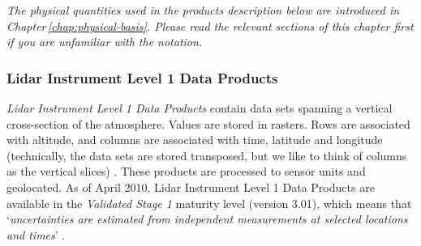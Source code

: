 \noindent\textit{The physical quantities used in the products description below are introduced in
Chapter\,\ref{chap:physical-basis}. Please read the relevant sections of this chapter
first if you are unfamiliar with the notation.}

\subsubsection{Lidar Instrument Level 1 Data Products}
\textit{Lidar Instrument Level 1 Data Products} contain data sets spanning
a vertical cross-section of the atmosphere. Values are stored
in rasters. Rows are associated with altitude, and columns are associated
with time, latitude and longitude (technically, the data sets are stored transposed,
but we like to think of columns as the vertical slices) . These products are processed to sensor units
and geolocated.
As of April 2010, Lidar Instrument Level 1 Data Products are available in the
\textit{Validated Stage 1}
maturity level (version 3.01), which means that `\textit{uncertainties are
estimated from independent measurements at selected locations and times}'
\citep{CALIPSO_QualityStatements}.
\pagebreak
